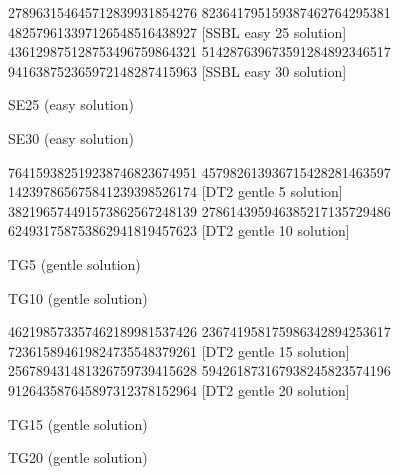 \documentclass[twoside]{article}
\begin{document}
\renewcommand*{\puzzlefile}{se25.ans}
\writepuzzle%
{278963154}{645712839}{931854276}%
{823641795}{159387462}{764295381}%
{482579613}{397126548}{516438927}%
[SSBL easy 25 solution]
\renewcommand*{\puzzlefile}{se30.ans}
\writepuzzle%
{436129875}{128753496}{759864321}%
{514287639}{673591284}{892346517}%
{941638752}{365972148}{287415963}%
[SSBL easy 30 solution]
\vfill
\noindent\begin{minipage}{0.47\linewidth}\begin{center}
SE25 (easy solution) \\
\end{center}\end{minipage}
\hfill
\begin{minipage}{0.47\linewidth}\begin{center}
SE30 (easy solution) \\
\end{center}\end{minipage}

\renewcommand*{\puzzlefile}{tg5.ans}
\writepuzzle%
{764159382}{519238746}{823674951}%
{457982613}{936715428}{281463597}%
{142397865}{675841239}{398526174}%
[DT2 gentle 5 solution]
\renewcommand*{\puzzlefile}{tg10.ans}
\writepuzzle%
{382196574}{491573862}{567248139}%
{278614395}{946385217}{135729486}%
{624931758}{753862941}{819457623}%
[DT2 gentle 10 solution]
\vfill
\noindent\begin{minipage}{0.47\linewidth}\begin{center}
TG5 (gentle solution) \\
\end{center}\end{minipage}
\hfill
\begin{minipage}{0.47\linewidth}\begin{center}
TG10 (gentle solution) \\
\end{center}\end{minipage}

\renewcommand*{\puzzlefile}{tg15.ans}
\writepuzzle%
{462198573}{357462189}{981537426}%
{236741958}{175986342}{894253617}%
{723615894}{619824735}{548379261}%
[DT2 gentle 15 solution]
\renewcommand*{\puzzlefile}{tg20.ans}
\writepuzzle%
{256789431}{481326759}{739415628}%
{594261873}{167938245}{823574196}%
{912643587}{645897312}{378152964}%
[DT2 gentle 20 solution]
\vfill
\noindent\begin{minipage}{0.47\linewidth}\begin{center}
TG15 (gentle solution) \\
\end{center}\end{minipage}
\hfill
\begin{minipage}{0.47\linewidth}\begin{center}
TG20 (gentle solution) \\
\end{center}\end{minipage}
\end{document}
